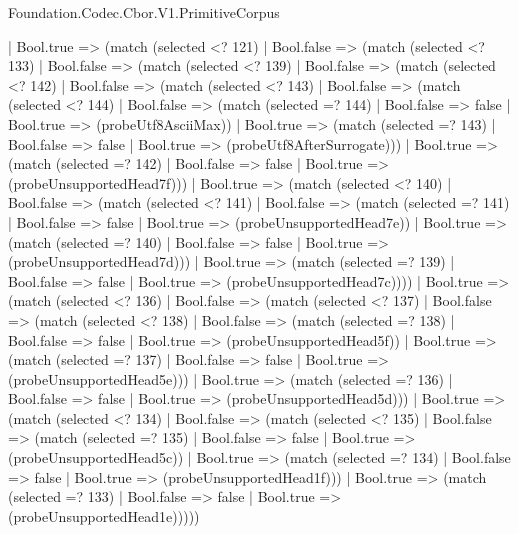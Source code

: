 \begin{lexlean}{Foundation.Codec.Cbor.V1.PrimitiveCorpus}
\begin{semanticmodule}
{      | Bool.true => (match (selected <? 121)
        | Bool.false => (match (selected <? 133)
          | Bool.false => (match (selected <? 139)
            | Bool.false => (match (selected <? 142)
              | Bool.false => (match (selected <? 143)
                | Bool.false => (match (selected <? 144)
                  | Bool.false => (match (selected =? 144)
                    | Bool.false => false
                    | Bool.true => (probeUtf8AsciiMax))
                  | Bool.true => (match (selected =? 143)
                    | Bool.false => false
                    | Bool.true => (probeUtf8AfterSurrogate)))
                | Bool.true => (match (selected =? 142)
                  | Bool.false => false
                  | Bool.true => (probeUnsupportedHead7f)))
              | Bool.true => (match (selected <? 140)
                | Bool.false => (match (selected <? 141)
                  | Bool.false => (match (selected =? 141)
                    | Bool.false => false
                    | Bool.true => (probeUnsupportedHead7e))
                  | Bool.true => (match (selected =? 140)
                    | Bool.false => false
                    | Bool.true => (probeUnsupportedHead7d)))
                | Bool.true => (match (selected =? 139)
                  | Bool.false => false
                  | Bool.true => (probeUnsupportedHead7c))))
            | Bool.true => (match (selected <? 136)
              | Bool.false => (match (selected <? 137)
                | Bool.false => (match (selected <? 138)
                  | Bool.false => (match (selected =? 138)
                    | Bool.false => false
                    | Bool.true => (probeUnsupportedHead5f))
                  | Bool.true => (match (selected =? 137)
                    | Bool.false => false
                    | Bool.true => (probeUnsupportedHead5e)))
                | Bool.true => (match (selected =? 136)
                  | Bool.false => false
                  | Bool.true => (probeUnsupportedHead5d)))
              | Bool.true => (match (selected <? 134)
                | Bool.false => (match (selected <? 135)
                  | Bool.false => (match (selected =? 135)
                    | Bool.false => false
                    | Bool.true => (probeUnsupportedHead5c))
                  | Bool.true => (match (selected =? 134)
                    | Bool.false => false
                    | Bool.true => (probeUnsupportedHead1f)))
                | Bool.true => (match (selected =? 133)
                  | Bool.false => false
                  | Bool.true => (probeUnsupportedHead1e)))))
}
\end{semanticmodule}
\end{lexlean}
